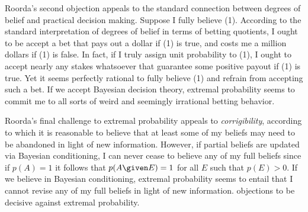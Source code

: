 Roorda's second objection appeals to the standard connection between degrees of
belief and practical decision making. Suppose I fully believe (1). According to
the standard interpretation of degrees of belief in terms of betting quotients,
I ought to be accept a bet that pays out a dollar if (1) is true, and costs me a
million dollars if (1) is false. In fact, if I truly assign unit probability to
(1), I ought to accept nearly any stakes whatsoever that guarantee some positive
payout if (1) is true. Yet it seems perfectly rational to fully believe (1) and
refrain from accepting such a bet. If we accept Bayesian decision theory,
extremal probability seems to commit me to all sorts of weird and seemingly
irrational betting behavior.

Roorda's final challenge to extremal probability appeals to {\em corrigibility},
according to which it is reasonable to believe that at least some of my beliefs
may need to be abandoned in light of new information. However, if partial
beliefs are updated via Bayesian conditioning, I can never cease to believe any
of my full beliefs since if $p(A)=1$ it follows that $p(A \given E)=1$ for all
$E$ such that $p(E)>0$. If we believe in Bayesian conditioning, extremal
probability seems to entail that I cannot revise any of my full beliefs in light
of new information.%
objections to be decisive against extremal probability. 

